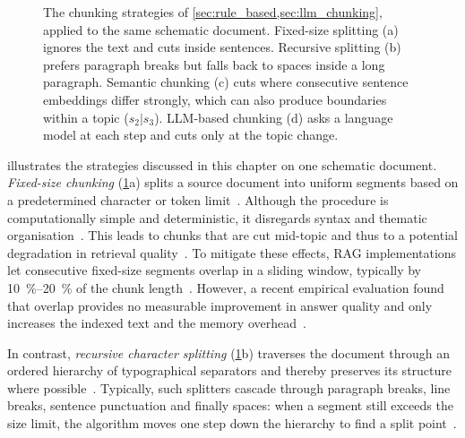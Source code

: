 \begin{figure}[htbp]
  \caption{The chunking strategies of \cref{sec:rule_based,sec:llm_chunking}, applied to the
  same schematic document. Fixed-size splitting (a) ignores the text and cuts inside
  sentences. Recursive splitting (b) prefers paragraph breaks but falls back to spaces
  inside a long paragraph. Semantic chunking (c) cuts where consecutive sentence
  embeddings differ strongly, which can also produce boundaries within a topic ($s_2|s_3$).
  LLM-based chunking (d) asks a language model at each step and cuts only at the topic
  change.}
  \label{fig:strategies}
\end{figure}

 illustrates the strategies discussed in this chapter on one schematic
document. \emph{Fixed-size chunking} (\cref{fig:strategies}a) splits a source document
into uniform segments based on a predetermined character or token
limit~\cite{qu-etal-2025-semantic}. Although the
procedure is computationally simple and deterministic, it disregards syntax and thematic
organisation~\cite{smigielski2026chunking}. This leads to chunks that are cut mid-topic and
thus to a potential degradation in retrieval quality~\cite{qu-etal-2025-semantic}. To
mitigate these effects, RAG implementations let consecutive fixed-size segments overlap in
a sliding window, typically by \SIrange{10}{20}{\percent} of the chunk
length~\cite{smigielski2026chunking}. However, a recent empirical evaluation found that
overlap provides no measurable improvement in answer quality and only increases the
indexed text and the memory overhead~\cite{bennani2026chunking}.

In contrast, \emph{recursive character splitting} (\cref{fig:strategies}b) traverses the document through an
ordered hierarchy of typographical separators and thereby preserves its structure where
possible~\cite{duarte2024lumberchunker}. Typically, such splitters cascade through
paragraph breaks, line breaks, sentence punctuation and finally spaces: when a segment
still exceeds the size limit, the algorithm moves one step down the hierarchy to find a
split point~\cite{duarte2024lumberchunker}.

